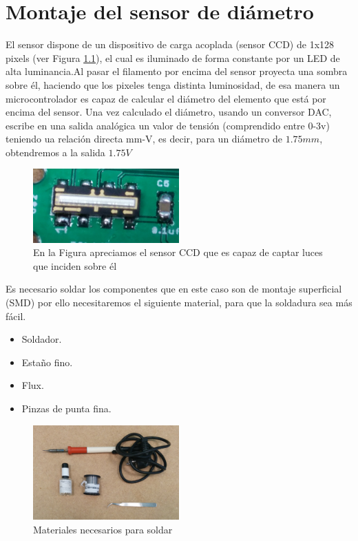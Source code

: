 \chapter{Montaje del sensor de diámetro}
\label{ane:sensor}

El sensor dispone de un dispositivo de carga acoplada (sensor CCD) de 1x128 pixels (ver Figura \ref{fig:sens_CCD}), el cual es iluminado de forma constante por un LED de alta luminancia.Al pasar el filamento por encima del sensor proyecta una sombra sobre él, haciendo que los pixeles tenga distinta luminosidad, de esa manera un microcontrolador es capaz de calcular el diámetro del elemento que está por encima del sensor. Una vez calculado el diámetro, usando un conversor DAC, escribe en una salida analógica un valor de tensión  (comprendido entre 0-3v) teniendo ua relación directa mm-V, es decir, para un diámetro de $1.75 mm$, obtendremos a la salida $1.75 V$\\

\begin{figure}[H]
    \centering
    \includegraphics[width=0.5\textwidth]{images/sensor/IMG_20150414_135533_.jpg}
    \caption[Sensor CCD lineal.]{En la Figura apreciamos el sensor CCD que es capaz de captar luces que inciden sobre él}
    \label{fig:sens_CCD}
\end{figure}

Es necesario soldar los componentes que en este caso son de montaje superficial (SMD) por ello necesitaremos el siguiente material, para que la soldadura sea más fácil.

\begin{itemize}
	\item{Soldador.}
	\item{Estaño fino.}
	\item{Flux.}
	\item{Pinzas de punta fina.}
\end{itemize}

\begin{figure}[H]
    \centering
    \includegraphics[width=0.5\textwidth]{images/sensor/IMG_20150417_160216.jpg}
    \caption{Materiales necesarios para soldar}
    \label{fig:sens_materiales}
\end{figure}

